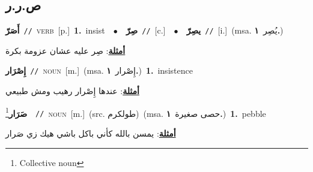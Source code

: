 \documentclass[10pt,a4paper,twoside]{article} %
\begin{document}
\begin{multicols}{2}
\vspace{-3mm}
\subsection*{\color{blue}\foreignlanguage{arabic}{ص.ر.ر}\color{blue}{}} 

{\setlength\topsep{0pt}\textbf{\foreignlanguage{arabic}{أَصَرّ}}\ {\color{gray}\texttt{//}\color{black}}\ \textsc{verb}\ [p.]\ \textbf{1.}~insist\ \ $\bullet$\ \ \setlength\topsep{0pt}\textbf{\foreignlanguage{arabic}{صِرّ}}\ {\color{gray}\texttt{//}\color{black}}\ [c.]\ \ $\bullet$\ \ \setlength\topsep{0pt}\textbf{\foreignlanguage{arabic}{يصِرّ}}\ {\color{gray}\texttt{//}\color{black}}\ [i.]\ \color{gray}(msa. \foreignlanguage{arabic}{يُصِر}~\foreignlanguage{arabic}{\textbf{١.}})\color{black}\  \begin{flushright}\color{gray}\foreignlanguage{arabic}{\textbf{\underline{\foreignlanguage{arabic}{أمثلة}}}: صِر عليه عشان عزومة بكرة}\end{flushright}\color{black}} \vspace{2mm}

{\setlength\topsep{0pt}\textbf{\foreignlanguage{arabic}{إِصْرَار}}\ {\color{gray}\texttt{//}\color{black}}\ \textsc{noun}\ [m.]\ \color{gray}(msa. \foreignlanguage{arabic}{إِصْرار}~\foreignlanguage{arabic}{\textbf{١.}})\color{black}\ \textbf{1.}~insistence\  \begin{flushright}\color{gray}\foreignlanguage{arabic}{\textbf{\underline{\foreignlanguage{arabic}{أمثلة}}}: عندها إِصْرار رهيب ومش طبيعي}\end{flushright}\color{black}} \vspace{2mm}

{\setlength\topsep{0pt}\textbf{\foreignlanguage{arabic}{صَرَار}}\footnote{Collective noun}\ \ {\color{gray}\texttt{//}\color{black}}\ \textsc{noun}\ [m.]\ (src. \color{gray}\foreignlanguage{arabic}{طولكرم}\color{black})\ \color{gray}(msa. \foreignlanguage{arabic}{حصى صغيرة}~\foreignlanguage{arabic}{\textbf{١.}})\color{black}\ \textbf{1.}~pebble\  \begin{flushright}\color{gray}\foreignlanguage{arabic}{\textbf{\underline{\foreignlanguage{arabic}{أمثلة}}}: يمسن بالله كأني باكل باشي هيك زي صَرار}\end{flushright}\color{black}} \vspace{2mm}


\end{multicols}
\end{document}
